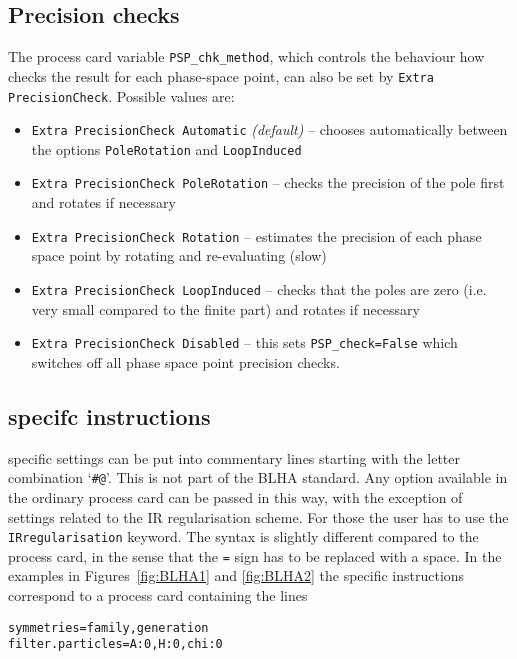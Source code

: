 %
%
%



%
%
%

\subsection{Precision checks}\label{sec:BLHA_precisionchecks}
The \gosam{} process card variable \texttt{PSP\_chk\_method}, which controls the behaviour how \gosam{} checks the result for each phase-space point, can also be set by \lstinline[style=sh]|Extra PrecisionCheck|. Possible values are:
\begin{itemize}
	\item \texttt{Extra PrecisionCheck Automatic} \textit{(default)} -- chooses automatically between the options \texttt{PoleRotation} and \texttt{LoopInduced}
	\item \texttt{Extra PrecisionCheck PoleRotation} -- checks the precision of the pole first and rotates if necessary
	\item \texttt{Extra PrecisionCheck Rotation} -- estimates the precision of each phase space point by rotating and re-evaluating (slow)
	\item \texttt{Extra PrecisionCheck LoopInduced} -- checks that the poles are zero (i.e. very small compared to the finite part) and rotates if necessary
	\item \texttt{Extra PrecisionCheck Disabled}  -- this sets \texttt{PSP\_check=False} which switches off all phase space point precision checks.
\end{itemize}


\subsection{\gosam specifc instructions}\label{sec:hashat_instructions}
\gosam specific settings can be put into commentary lines starting with the letter combination `\texttt{\#@}'. This is not part of the BLHA standard. Any option available in the ordinary \gosam process card can be passed in this way, with the exception of settings related to the IR regularisation scheme. For those the user has to use the \texttt{IRregularisation} keyword. The syntax is slightly different compared to the process card, in the sense that the \texttt{=} sign has to be replaced with a space. In the examples in Figures~\ref{fig:BLHA1} and \ref{fig:BLHA2} the specific instructions correspond to a process card containing the lines
\begin{lstlisting}[gobble=0,style=in]
symmetries=family,generation
filter.particles=A:0,H:0,chi:0
\end{lstlisting}


